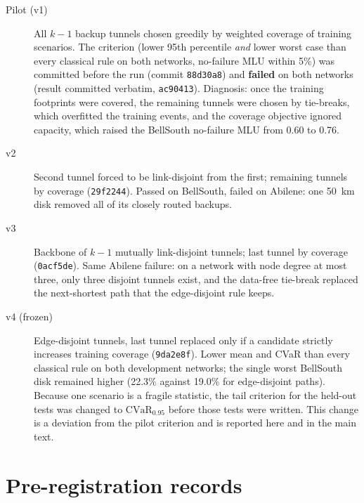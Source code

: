 \documentclass[12pt]{article}
\begin{document}
\begin{description}
\item[Pilot (v1)] All $k-1$ backup tunnels chosen greedily by weighted coverage of training scenarios. The criterion (lower 95th percentile \emph{and} lower worst case than every classical rule on both networks, no-failure MLU within 5\%) was committed before the run (commit \texttt{88d30a8}) and \textbf{failed} on both networks (result committed verbatim, \texttt{ac90413}). Diagnosis: once the training footprints were covered, the remaining tunnels were chosen by tie-breaks, which overfitted the training events, and the coverage objective ignored capacity, which raised the BellSouth no-failure MLU from 0.60 to 0.76.
\item[v2] Second tunnel forced to be link-disjoint from the first; remaining tunnels by coverage (\texttt{29f2244}). Passed on BellSouth, failed on Abilene: one 50~km disk removed all of its closely routed backups.
\item[v3] Backbone of $k-1$ mutually link-disjoint tunnels; last tunnel by coverage (\texttt{0acf5de}). Same Abilene failure: on a network with node degree at most three, only three disjoint tunnels exist, and the data-free tie-break replaced the next-shortest path that the edge-disjoint rule keeps.
\item[v4 (frozen)] Edge-disjoint tunnels, last tunnel replaced only if a candidate strictly increases training coverage (\texttt{9da2e8f}). Lower mean and CVaR than every classical rule on both development networks; the single worst BellSouth disk remained higher (22.3\% against 19.0\% for edge-disjoint paths). Because one scenario is a fragile statistic, the tail criterion for the held-out tests was changed to $\mathrm{CVaR}_{0.95}$ before those tests were written. This change is a deviation from the pilot criterion and is reported here and in the main text.
\end{description}

\begin{table}[h]
\centering
\caption{Development history on the natural test scenarios of the development networks (Abilene: 6 hurricane and 800 disk scenarios; BellSouth: 16 and 800). Each version is shown with the edge-disjoint rule for reference.}
\label{tab:s1}
\resizebox{\linewidth}{!}{}
\end{table}

\section{Pre-registration records}
\label{sec:s2}
\end{document}
